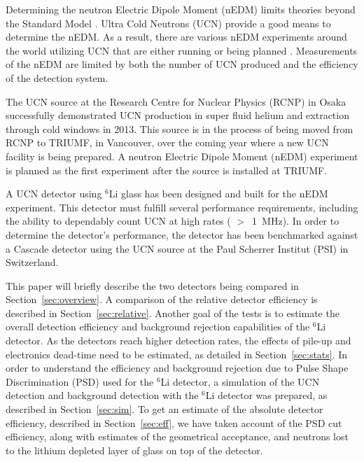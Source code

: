\documentclass[review]{elsarticle}
\begin{document}
Determining the neutron Electric Dipole Moment (nEDM) limits theories
beyond the Standard Model \cite{pospelov}.  Ultra Cold Neutrons (UCN)
provide a good means to determine the nEDM.  As a result, there are
various nEDM experiments around the world utilizing UCN that are
either running or being planned \cite{fillipone,PSI,Gatchina,
  APSerebov, KKirch, CABaker, YMasuda, IAltarev, RGolub, SNS}.
Measurements of the nEDM are limited by both the number of UCN
produced and the efficiency of the detection system.

The UCN source at the Research Centre for Nuclear Physics (RCNP) in
Osaka successfully demonstrated UCN production in super fluid helium
and extraction through cold windows in 2013.  This source is in the
process of being moved from RCNP to TRIUMF, in Vancouver, over the
coming year where a new UCN facility is being prepared.  A neutron
Electric Dipole Moment (nEDM) experiment is planned as the first
experiment after the source is installed at TRIUMF.

A UCN detector using $^6$Li glass has been designed and built for the
nEDM experiment.  This detector must fulfill several performance
requirements, including the ability to dependably count UCN at high
rates ( $>$~1~MHz).  In order to determine the detector's performance,
the detector has been benchmarked against a Cascade detector using the
UCN source at the Paul Scherrer Institut (PSI) in Switzerland.

This paper will briefly describe the two detectors being compared in
Section~\ref{sec:overview}.  A comparison of the relative detector
efficiency is described in Section~\ref{sec:relative}.  Another goal
of the tests is to estimate the overall detection efficiency and
background rejection capabilities of the $^{6}$Li detector.  As the
detectors reach higher detection rates, the effects of pile-up and
electronics dead-time need to be estimated, as detailed in
Section~\ref{sec:stats}.  In order to understand the efficiency and
background rejection due to Pulse Shape Discrimination (PSD) used for
the $^{6}$Li detector, a simulation of the UCN detection and
background detection with the $^{6}$Li detector was prepared, as
described in Section~\ref{sec:sim}.  To get an estimate of the
absolute detector efficiency, described in Section~\ref{sec:eff}, we
have taken account of the PSD cut efficiency, along with estimates of
the geometrical acceptance, and neutrons lost to the lithium depleted
layer of glass on top of the detector.
\end{document}
